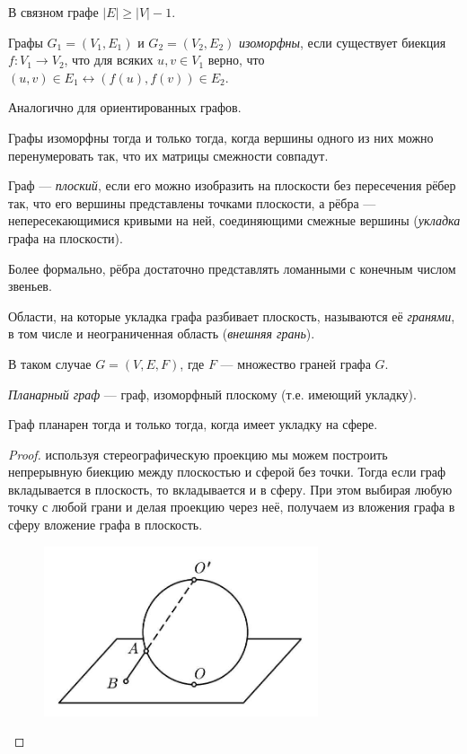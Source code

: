 \documentclass[12pt,a4paper]{article}
\begin{document}
    \begin{corollary}
        В связном графе $|E| \geqslant |V| - 1$.
    \end{corollary}

    \begin{definition}
        Графы $G_1 = (V_1, E_1)$ и $G_2 = (V_2, E_2)$ \emph{изоморфны}, если существует биекция $f: V_1 \to V_2$, что для всяких $u, v \in V_1$ верно, что $(u, v) \in E_1 \leftrightarrow (f(u), f(v)) \in E_2$.

        Аналогично для ориентированных графов.
    \end{definition}

    \begin{remark}
        Графы изоморфны тогда и только тогда, когда вершины одного из них можно перенумеровать так, что их матрицы смежности совпадут.
    \end{remark}

    \begin{definition}
        Граф --- \emph{плоский}, если его можно изобразить на плоскости без пересечения рёбер так, что его вершины представлены точками плоскости, а рёбра --- непересекающимися кривыми на ней, соединяющими смежные вершины (\emph{укладка} графа на плоскости).

        Более формально, рёбра достаточно представлять ломанными с конечным числом звеньев.

        Области, на которые укладка графа разбивает плоскость, называются её \emph{гранями}, в том числе и неограниченная область (\emph{внешняя грань}).

        В таком случае $G = (V, E, F)$, где $F$ --- множество граней графа $G$.

        \emph{Планарный граф} --- граф, изоморфный плоскому (т.е. имеющий укладку).
    \end{definition}

    \begin{theorem}
        Граф планарен тогда и только тогда, когда имеет укладку на сфере.
    \end{theorem}

    \begin{proof}
        используя стереографическую проекцию мы можем построить непрерывную биекцию между плоскостью и сферой без точки. Тогда если граф вкладывается в плоскость, то вкладывается и в сферу. При этом выбирая любую точку с любой грани и делая проекцию через неё, получаем из вложения графа в сферу вложение графа в плоскость.
        \begin{figure}[h]
            \centering
            \includegraphics[height=5cm]{DM-01.jpg}
        \end{figure}
    \end{proof}
\end{document}
